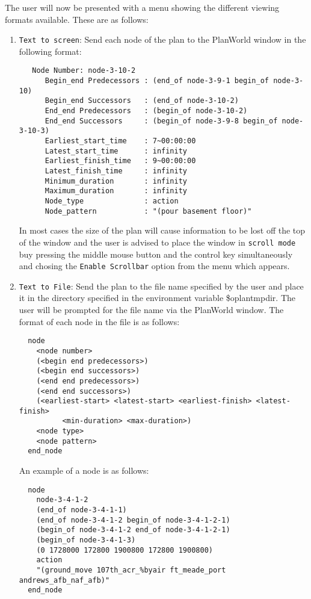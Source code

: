 \begin{enumerate}
The user will now be presented with a menu showing the different
viewing formats available. These are as follows:

\begin{enumerate}
\item {\tt Text to screen}: Send each node of the plan to the
PlanWorld window in the following format:

\begin{verbatim} 
   Node Number: node-3-10-2
      Begin_end Predecessors : (end_of node-3-9-1 begin_of node-3-10)
      Begin_end Successors   : (end_of node-3-10-2)
      End_end Predecessors   : (begin_of node-3-10-2)
      End_end Successors     : (begin_of node-3-9-8 begin_of node-3-10-3)
      Earliest_start_time    : 7~00:00:00
      Latest_start_time      : infinity
      Earliest_finish_time   : 9~00:00:00
      Latest_finish_time     : infinity
      Minimum_duration       : infinity
      Maximum_duration       : infinity
      Node_type              : action
      Node_pattern           : "(pour basement floor)"
\end{verbatim}

In most cases the size of the plan will cause information to be lost
off the top of the window and the user is advised to place the window
in {\tt scroll mode} buy pressing the middle mouse button and the
control key simultaneously and chosing the {\tt Enable Scrollbar}
option from the menu which appears.  

\item {\tt Text to File}: Send the plan to the file name specified by
the user and place it in the directory specified in the environment
variable {\sc \$oplantmpdir}. The user will be prompted for the file
name via the PlanWorld window. The format of each node in the file is
as follows:

\begin{verbatim} 
  node 
    <node number>
    (<begin end predecessors>)
    (<begin end successors>)
    (<end end predecessors>)
    (<end end successors>)
    (<earliest-start> <latest-start> <earliest-finish> <latest-finish> 
          <min-duration> <max-duration>)
    <node type>
    <node pattern>
  end_node
\end{verbatim}

An example of a node is as follows:

\begin{verbatim} 
  node
    node-3-4-1-2                                  
    (end_of node-3-4-1-1)                         
    (end_of node-3-4-1-2 begin_of node-3-4-1-2-1)
    (begin_of node-3-4-1-2 end_of node-3-4-1-2-1)
    (begin_of node-3-4-1-3)
    (0 1728000 172800 1900800 172800 1900800)
    action
    "(ground_move 107th_acr_%byair ft_meade_port andrews_afb_naf_afb)"
  end_node
\end{verbatim}


\end{enumerate}
\end{enumerate}
